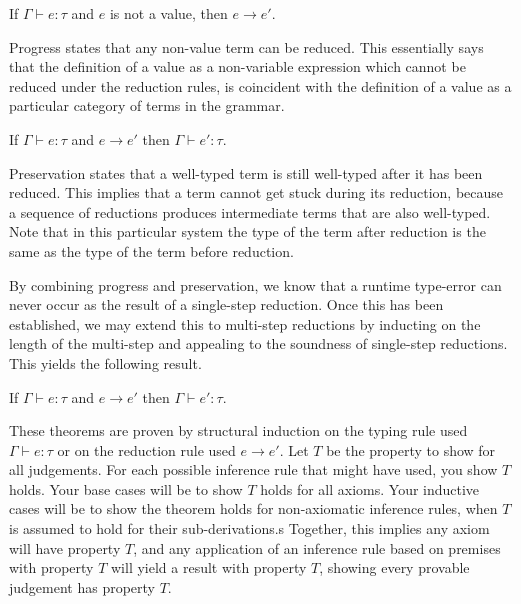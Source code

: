 \begin{theorem}[Progress]
If $\Gamma \vdash e: \tau$ and $e$ is not a value, then $e \longrightarrow e'$.
\end{theorem}

Progress states that any non-value term can be reduced. This essentially says that the definition of a value as a non-variable expression which cannot be reduced under the reduction rules, is coincident with the definition of a value as a particular category of terms in the grammar.

\begin{theorem}[Preservation]
If $\Gamma \vdash e: \tau$ and $e \longrightarrow e'$ then $\Gamma \vdash e': \tau$.
\end{theorem}

Preservation states that a well-typed term is still well-typed after it has been reduced. This implies that a term cannot get stuck during its reduction, because a sequence of reductions produces intermediate terms that are also well-typed. Note that in this particular system the type of the term after reduction is the same as the type of the term before reduction.

By combining progress and preservation, we know that a runtime type-error can never occur as the result of a single-step reduction. Once this has been established, we may extend this to multi-step reductions by inducting on the length of the multi-step and appealing to the soundness of single-step reductions. This yields the following result.

\begin{theorem}[Soundness]
If $\Gamma \vdash e: \tau$ and $e \longrightarrow e'$ then $\Gamma \vdash e': \tau$.
\end{theorem}

These theorems are proven by structural induction on the typing rule used $\Gamma \vdash e: \tau$ or on the reduction rule used $e \rightarrow e'$. Let $T$ be the property to show for all judgements. For each possible inference rule that might have used, you show $T$ holds. Your base cases will be to show $T$ holds for all axioms. Your inductive cases will be to show the theorem holds for non-axiomatic inference rules, when $T$ is assumed to hold for their sub-derivations.s Together, this implies any axiom will have property $T$, and any application of an inference rule based on premises with property $T$ will yield a result with property $T$, showing every provable judgement has property $T$.

